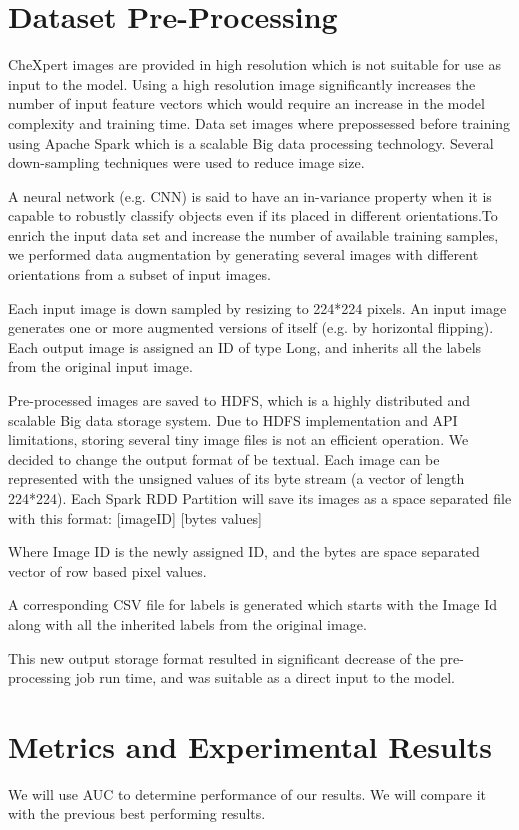 \documentclass{amia}
\begin{document}
\section*{Dataset Pre-Processing}

CheXpert\cite{ref2} images are provided in high resolution which is not suitable for use as input to the model. Using a high resolution image significantly increases the number of input feature vectors which would require an increase in the model complexity and training time. Data set images where prepossessed before training using Apache Spark which is a scalable Big data processing technology. Several down-sampling techniques were used to reduce image size.

A neural network (e.g. CNN) is said to have an in-variance property when it is capable to robustly classify objects even if its placed in different orientations.To enrich the input data set and increase the number of available training samples, we performed data augmentation by generating several images with different orientations from a subset of input images.

Each input image is down sampled by resizing to 224*224 pixels. An input image generates one or more augmented versions of itself (e.g. by horizontal flipping). Each output image is assigned an ID of type Long, and inherits all the labels from the original input image.

Pre-processed images are saved to HDFS, which is a highly distributed and scalable Big data storage system. Due to HDFS implementation and API limitations, storing several tiny image files is not an efficient operation.
We decided to change the output format of be textual. Each image can be represented with the unsigned values of its byte stream (a vector of length 224*224). Each Spark RDD Partition will save its images as a space separated file with this format:
[imageID] [bytes values]

Where Image ID is the newly assigned ID, and the bytes are space separated vector of row based pixel values.

A corresponding CSV file for labels is generated which starts with the Image Id along with all the inherited labels from the original image.

This new output storage format resulted in significant decrease of the pre-processing job run time, and was suitable as a direct input to the model.



\section*{Metrics and Experimental Results}
We will use AUC to determine performance of our results. We will compare it with the previous best performing results.
\end{document}
